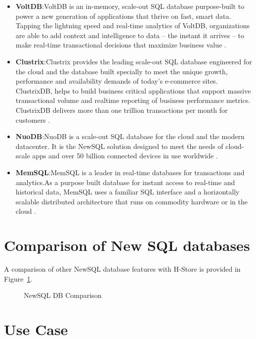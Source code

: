 \documentclass[9pt,twocolumn,twoside]{../../styles/osajnl}
\begin{document}
\begin{itemize}
\item \textbf{VoltDB}:VoltDB is an in-memory, scale-out SQL database purpose-built to power a new
generation of applications that thrive on fast, smart data. Tapping the lightning
speed and real-time analytics of VoltDB, organizations are able to add context
and intelligence to data – the instant it arrives – to make real-time transactional
decisions that maximize business value \cite{www-VoltDB}.

\item \textbf{Clustrix}:Clustrix provides the leading scale-out SQL database engineered for the cloud
and the database built specially to meet the unique growth, performance and
availability demands of today’s e-commerce sites. ClustrixDB, helps to build
business critical applications that support massive transactional volume and realtime
reporting of business performance metrics. ClustrixDB delivers more than
one trillion transactions per month for customers \cite{www-ClustrixDB}.

\item \textbf{NuoDB}:NuoDB is a scale-out SQL database for the cloud and the modern datacenter. It is
the NewSQL solution designed to meet the needs of cloud-scale apps and over
50 billion connected devices in use worldwide \cite{www-NuoDB}.

\item \textbf{MemSQL}:MemSQL is a leader in real-time databases for transactions and analytics.As a
purpose built database for instant access to real-time and historical data,
MemSQL uses a familiar SQL interface and a horizontally scalable distributed
architecture that runs on commodity hardware or in the cloud \cite{www-Memsql}.
\end{itemize}

\section{Comparison of New SQL databases}

A comparison of other NewSQL  database features with H-Store is provided in Figure~\ref{fig:compare}.
\begin{figure}[]
\centering
\graphicspath{ {images/} }
\caption{NewSQL DB Comparison} \cite{pavlo16}
\label{fig:compare}
\end{figure}


\section{Use Case}
 
\end{document}

